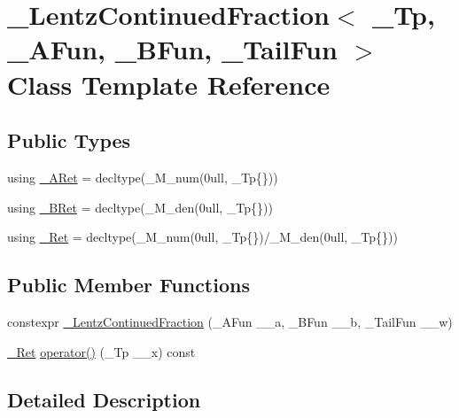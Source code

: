 \hypertarget{class__LentzContinuedFraction}{}\section{\+\_\+\+Lentz\+Continued\+Fraction$<$ \+\_\+\+Tp, \+\_\+\+A\+Fun, \+\_\+\+B\+Fun, \+\_\+\+Tail\+Fun $>$ Class Template Reference}
\label{class__LentzContinuedFraction}
\subsection*{Public Types}
\begin{DoxyCompactItemize}
\item 
using \hyperlink{class__LentzContinuedFraction_a44dee6f8bd3dfe70d76c85b518589dec}{\+\_\+\+A\+Ret} = decltype(\+\_\+\+M\+\_\+num(0ull, \+\_\+\+Tp\{\}))
\item 
using \hyperlink{class__LentzContinuedFraction_a97536abf4c68ac813d692d204ac47ba4}{\+\_\+\+B\+Ret} = decltype(\+\_\+\+M\+\_\+den(0ull, \+\_\+\+Tp\{\}))
\item 
using \hyperlink{class__LentzContinuedFraction_ae549d8853f57a08201bea3a926d30992}{\+\_\+\+Ret} = decltype(\+\_\+\+M\+\_\+num(0ull, \+\_\+\+Tp\{\})/\+\_\+\+M\+\_\+den(0ull, \+\_\+\+Tp\{\}))
\end{DoxyCompactItemize}
\subsection*{Public Member Functions}
\begin{DoxyCompactItemize}
\item 
constexpr \hyperlink{class__LentzContinuedFraction_a329c859fde4ae8a79b4fdc04731a1901}{\+\_\+\+Lentz\+Continued\+Fraction} (\+\_\+\+A\+Fun \+\_\+\+\_\+a, \+\_\+\+B\+Fun \+\_\+\+\_\+b, \+\_\+\+Tail\+Fun \+\_\+\+\_\+w)
\item 
\hyperlink{class__LentzContinuedFraction_ae549d8853f57a08201bea3a926d30992}{\+\_\+\+Ret} \hyperlink{class__LentzContinuedFraction_a7b7d840c3192d56daf9b8b273f6166db}{operator()} (\+\_\+\+Tp \+\_\+\+\_\+x) const
\end{DoxyCompactItemize}


\subsection{Detailed Description}
